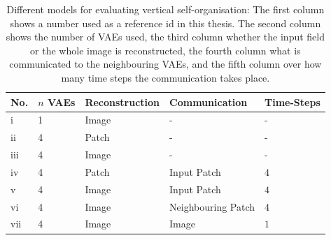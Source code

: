 \begin{table}[h] 
    \centering
	 \begin{tabular}{l l l l l}
    	\textbf{No.} & \textbf{$n$ VAEs} & \textbf{Reconstruction} & \textbf{Communication} & \textbf{Time-Steps}\\
        \hline
		i & 1 & Image & -  & -\\
		ii & 4 & Patch & -  & -\\
		iii & 4 & Image & - & -\\
		iv & 4 & Patch & Input Patch & $4$\\ %
		v & 4 & Image & Input Patch & $4$\\  %
		vi & 4 & Image & Neighbouring Patch & $4$\\ %
		vii & 4 & Image & Image & $1$\\
    \end{tabular}
    \caption[Different models to evaluate vertical self-organisation]{Different models for evaluating vertical self-organisation: The first column shows a number used as a reference id in this thesis. The second column shows the number of VAEs used, the third column whether the input field or the whole image is reconstructed, the fourth column what is communicated to the neighbouring VAEs, and the fifth column over how many time steps the communication takes place.}
\end{table}

